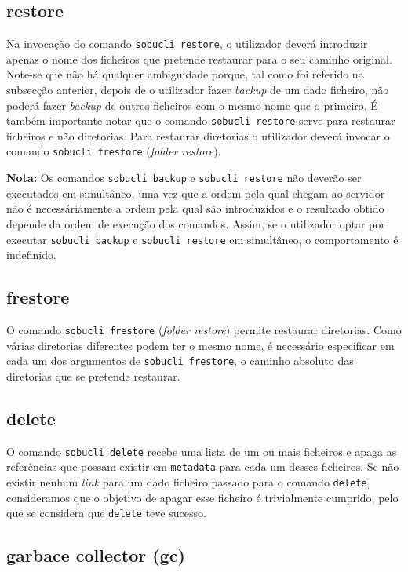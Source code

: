\documentclass[a4paper,12pt,titlepage,portuguese]{article}
\begin{document}
\subsection{restore}

Na invocação do comando \texttt{sobucli restore}, o utilizador deverá introduzir apenas o nome dos ficheiros que pretende restaurar para o seu caminho original. Note-se que não há qualquer ambiguidade porque, tal como foi referido na subsecção anterior, depois de o utilizador fazer \emph{backup} de um dado ficheiro, não poderá fazer \emph{backup} de outros ficheiros com o mesmo nome que o primeiro. É também importante notar que o comando \texttt{sobucli restore} serve para restaurar ficheiros e não diretorias. Para restaurar diretorias o utilizador deverá invocar o comando \texttt{sobucli frestore} (\emph{folder restore}).

\textbf{Nota:} Os comandos \texttt{sobucli backup} e \texttt{sobucli restore} não deverão ser executados em simultâneo, uma vez que a ordem pela qual chegam ao servidor não é necessáriamente a ordem pela qual são introduzidos e o resultado obtido depende da ordem de execução dos comandos. Assim, se o utilizador optar por executar \texttt{sobucli backup} e \texttt{sobucli restore} em simultâneo, o comportamento é indefinido.

\subsection{frestore}

O comando \texttt{sobucli frestore} (\emph{folder restore}) permite restaurar diretorias. Como várias diretorias diferentes podem ter o mesmo nome, é necessário especificar em cada um dos argumentos de \texttt{sobucli frestore}, o caminho absoluto das diretorias que se pretende restaurar.

\subsection{delete}

O comando \texttt{sobucli delete} recebe uma lista de um ou mais \underline{ficheiros} e apaga as referências que possam existir em \texttt{metadata\/} para cada um desses ficheiros. Se não existir nenhum \emph{link} para um dado ficheiro passado para o comando \texttt{delete}, consideramos que o objetivo de apagar esse ficheiro é trivialmente cumprido, pelo que se considera que \texttt{delete} teve sucesso.

\subsection{garbace collector (gc)}
\end{document}
